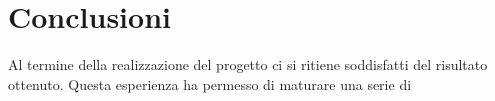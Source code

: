 \chapter{Conclusioni}
Al termine della realizzazione del progetto ci si ritiene soddisfatti del risultato ottenuto. Questa esperienza ha permesso di maturare una serie di 